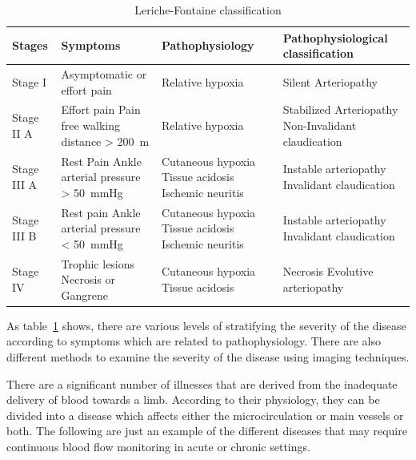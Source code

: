 \begin{table}
\caption{Leriche-Fontaine classification}
\centering
\label{table:Fontaine}
\begin{tabular}{p{1.8cm} p{3.8cm} p{3.5cm} p{4.5cm}}
\toprule
\textbf{Stages}& \textbf{Symptoms} & \textbf{Pathophysiology} & \textbf{Pathophysiological \newline classification} \\
\midrule
Stage I & Asymptomatic \newline or effort pain & Relative hypoxia & Silent Arteriopathy \\
\midrule
Stage II A & Effort pain \newline Pain free walking distance > \SI{200}{\meter} & Relative hypoxia & Stabilized Arteriopathy \newline Non-Invalidant claudication \\ 
\midrule
Stage III A & Rest Pain \newline Ankle arterial pressure > \SI{50}{\mmHg} & Cutaneous hypoxia \newline Tissue acidosis \newline Ischemic neuritis & Instable arteriopathy \newline Invalidant claudication \\
\midrule
Stage III B & Rest pain \newline Ankle arterial pressure < \SI{50}{\mmHg} & Cutaneous hypoxia \newline Tissue acidosis \newline Ischemic neuritis & Instable arteriopathy \newline
Invalidant claudication \\
\midrule
Stage IV & Trophic lesions \newline Necrosis or Gangrene & Cutaneous hypoxia \newline 
Tissue acidosis & Necrosis \newline Evolutive arteriopathy \\
\bottomrule
\end{tabular}
\end{table}

As table~\ref{table:Fontaine} shows, there are various levels of stratifying the severity of the disease according to symptoms which are related to pathophysiology. There are also different methods to examine the severity of the disease using imaging techniques.

There are a significant number of illnesses that are derived from the inadequate delivery of blood towards a limb. According to their physiology, they can be divided into a disease which affects either the microcirculation or main vessels or both. The following are just an example of the different diseases that may require continuous blood flow monitoring in acute or chronic settings.




